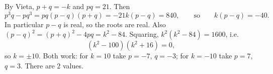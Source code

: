 By Vieta, $p+q=-k$ and $pq=21$. Then
\[p^3q-pq^3=pq(p-q)(p+q)=-21k(p-q)=840,\qquad\text{so}\qquad k(p-q)=-40.\]
In particular $p-q$ is real, so the roots are real. Also $(p-q)^2=(p+q)^2-4pq=k^2-84$. Squaring, $k^2(k^2-84)=1600$, i.e.
\[(k^2-100)(k^2+16)=0,\]
so $k=\pm10$. Both work: for $k=10$ take $p=-7$, $q=-3$; for $k=-10$ take $p=7$, $q=3$. There are $\boxed{2}$ values.
